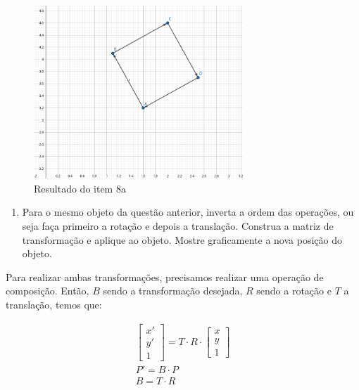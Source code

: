 \documentclass[12pt]{article}
\begin{document}
\begin{figure}[H]
    \centering
    \includegraphics[width=0.7\textwidth]{images/8a_resp.png}
    \caption{Resultado do item 8a}
    \label{fig:8a_resp}
\end{figure}

\begin{enumerate}[label=\alph*), resume]
    \item Para o mesmo objeto da questão anterior, inverta a ordem das operações, ou seja faça primeiro a rotação e depois a translação. Construa a matriz de transformação e aplique ao objeto. Mostre graficamente a nova posição do objeto.
\end{enumerate}

Para realizar ambas transformações, precisamos realizar uma operação de composição. Então, $B$ sendo a transformação desejada, $R$ sendo a rotação e $T$ a translação, temos que:

\begin{gather*}
    \begin{bmatrix}
    x' \\
    y' \\
    1
    \end{bmatrix}
    = T \cdot R \cdot
    \begin{bmatrix}
    x \\
    y \\
    1
    \end{bmatrix} \\
    P' = B \cdot P \\
    B = T \cdot R
\end{gather*}
\end{document}
